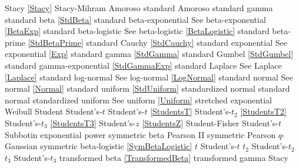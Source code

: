 Stacy 						\dotfill	\eqref{Stacy} 						\ncite	%
Stacy-Mihram					\dotfill	Amoroso							\ncite	%
standard Amoroso				\dotfill	standard gamma 					\ncite	%
standard beta					\dotfill	\eqref{StdBeta} 					\ncite	%
standard beta-exponential			\dotfill	See beta-exponential \eqref{BetaExp}	\ncite	%
standard beta-logistic			\dotfill	See beta-logistic \eqref{BetaLogistic}		\ncite	%
standard beta-prime				\dotfill	\eqref{StdBetaPrime}				\ncite	%
standard Cauchy				\dotfill	\eqref{StdCauchy} 					\ncite	%
standard exponential				\dotfill	See exponential \eqref{Exp} 			\ncite	%
standard gamma 				\dotfill	\eqref{StdGamma} 					\ncite	%
standard Gumbel 				\dotfill	\eqref{StdGumbel} 					\ncite	%
standard gamma-exponential		\dotfill	\eqref{StdGammaExp} 				\ncite	%
standard Laplace				\dotfill	See Laplace \eqref{Laplace}			\ncite	%
standard log-normal				\dotfill	See log-normal \eqref{LogNormal} 		\ncite	%
standard normal 				\dotfill	See normal \eqref{Normal} 			\ncite	%
standard uniform				\dotfill	\eqref{StdUniform}					\ncite	%
standardized normal 				\dotfill	standard normal					\ncite	%
standardized uniform 			\dotfill	See uniform \eqref{Uniform}			\ncite	%
stretched exponential 			\dotfill	Weibull 								
Student						\dotfill 	Student's-$t$						\ncite	%
Student's-$t$					\dotfill	\eqref{StudentsT}  					\ncite	%
Student's-$t_2$					\dotfill	\eqref{StudentsT2}  					\ncite	%
Student's-$t_3$					\dotfill	\eqref{StudentsT3}  					\ncite	
Student's-$z$					\dotfill	\eqref{StudentsZ}					\ncite	%
Student-Fisher					\dotfill	Student's-$t$							%
Subbotin						\dotfill	exponential power					\ncite
symmetric beta					\dotfill	Pearson II							\ncite	%
symmetric Pearson				\dotfill	$q$-Gaussian						\mcite{\self}		%
symmetric beta-logistic			\dotfill	\eqref{SymBetaLogistic}				\mcite{\self}
%
$t$							\dotfill	Student's-$t$ 						\ncite	%
$t_2$						\dotfill	Student's-$t_2$ 					\ncite	%
$t_3$						\dotfill	Student's-$t_3$ 					\ncite
transformed beta				\dotfill	\eqref{TransformedBeta} 				\ncite	%
transformed gamma				\dotfill	Stacy 							\ncite %
